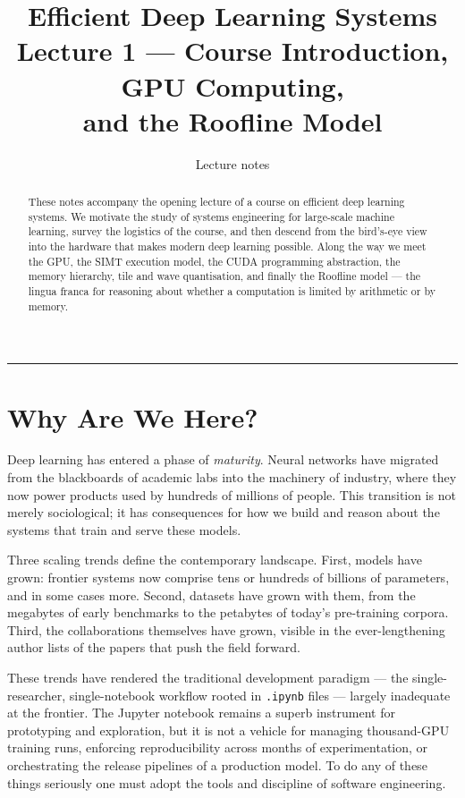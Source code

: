 \documentclass[11pt,a4paper]{article}
\title{\textbf{Efficient Deep Learning Systems} \\[0.3em]
       \large Lecture 1 --- Course Introduction, GPU Computing, \\
       and the Roofline Model}
\author{Lecture notes}
\date{}
\theoremstyle{definition}
\theoremstyle{remark}
\theoremstyle{plain}
\begin{document}
\sloppy
\maketitle


\begin{abstract}
\noindent
These notes accompany the opening lecture of a course on efficient
deep learning systems. We motivate the study of systems engineering
for large-scale machine learning, survey the logistics of
the course, and then descend from the bird's-eye view into the
hardware that makes modern deep learning possible. Along the way we
meet the GPU, the SIMT execution model, the CUDA programming
abstraction, the memory hierarchy, tile and wave quantisation, and
finally the Roofline model --- the lingua franca for reasoning about
whether a computation is limited by arithmetic or by memory.
\end{abstract}

\tableofcontents
\bigskip
\hrule
\bigskip

\section{Why Are We Here?}

Deep learning has entered a phase of \emph{maturity}. Neural networks
have migrated from the blackboards of academic labs into the machinery
of industry, where they now power products used by hundreds of
millions of people. This transition is not merely sociological; it has
consequences for how we build and reason about the systems that train
and serve these models.

Three scaling trends define the contemporary landscape. First, models
have grown: frontier systems now comprise tens or hundreds of billions
of parameters, and in some cases more. Second, datasets have grown
with them, from the megabytes of early benchmarks to the petabytes of
today's pre-training corpora. Third, the collaborations themselves
have grown, visible in the ever-lengthening author lists of the
papers that push the field forward.

These trends have rendered the traditional development paradigm ---
the single-researcher, single-notebook workflow rooted in
\texttt{.ipynb} files --- largely inadequate at the frontier. The
Jupyter notebook remains a superb instrument for prototyping and
exploration, but it is not a vehicle for managing thousand-GPU
training runs, enforcing reproducibility across months of
experimentation, or orchestrating the release pipelines of a
production model. To do any of these things seriously one must adopt
the tools and discipline of software engineering.
\end{document}
